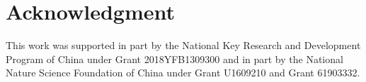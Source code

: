 \documentclass[journal]{IEEEtran}
\begin{document}
\section*{Acknowledgment}
This work was supported in part by the National Key Research and Development Program of China under Grant 2018YFB1309300 and in part by the National Nature Science Foundation of China under Grant U1609210 and Grant 61903332. 



\ifCLASSOPTIONcaptionsoff
  \newpage
\fi





%
%
%
%
%

% 
\end{document}
